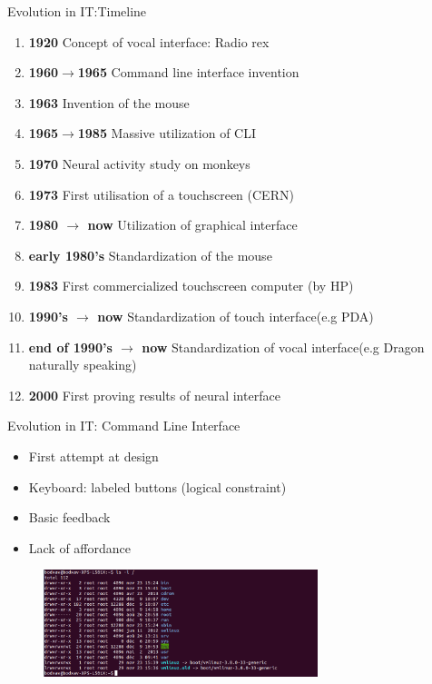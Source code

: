 \documentclass{beamer}
\begin{document}
\begin{frame}{Evolution in IT:Timeline}

\begin{enumerate}
\item \textbf{1920} Concept of vocal interface: Radio rex
\item \textbf{1960$\rightarrow$1965} Command line interface invention
\item \textbf{1963} Invention of the mouse
\item \textbf{1965$\rightarrow$1985} Massive utilization of CLI
\item \textbf{1970} Neural activity study on monkeys
\item \textbf{1973} First utilisation of a touchscreen (CERN)
\item \textbf{1980 $\rightarrow$ now} Utilization of graphical interface
\item \textbf{early 1980's} Standardization of the mouse
\item \textbf{1983} First commercialized touchscreen computer (by HP)
\item \textbf{1990's $\rightarrow$ now} Standardization of touch interface(e.g PDA)
\item \textbf{end of 1990's $\rightarrow$ now} Standardization of vocal interface(e.g Dragon naturally speaking)
\item \textbf{2000} First proving results of neural interface
\end{enumerate}
\end{frame}

\begin{frame}{Evolution in IT: Command Line Interface}

\begin{itemize}
\item First attempt at design
\item Keyboard: labeled buttons (logical constraint)
\item Basic feedback
\item Lack of affordance
\end{itemize}
	\begin{figure}
			  \begin{minipage}{5cm}
				  \includegraphics[width=8cm]{terminal.png}
			  \end{minipage}

		\end{figure}
\end{frame}
\end{document}
